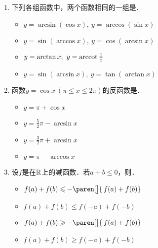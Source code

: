 \documentclass[a4paper,punct=CCT]{ctexbook}
\theoremstyle{definition}
\theoremstyle{remark}
\newif\ifshowsol
\let\leq\leqslant
\let\le\leq
\let\geq\geqslant
\let\ge\geq}
\begin{document}
\begin{enumerate}
\item 下列各组函数中，两个函数相同的一组是\uline{\makebox[6em]{}}．
  \begin{itemize}
    \renewcommand{\labelitemi}{\faCircleThin}
  \item \(y = \arcsin(\cos x),\ y = \arccos(\sin x)\)
    \ifshowsol
  \item[\faCircle] \(y = \sin(\arccos x),\ y = \cos(\arcsin x)\)
    \else
  \item \(y = \sin(\arccos x),\ y = \cos(\arcsin x)\)
    \fi
  \item \(y = \arctan x,\ y = \operatorname{arccot}\frac1x\)
  \item \(y = \sin(\arcsin x),\ y = \tan(\arctan x)\)
  \end{itemize}

  \ifshowsol
  选项C和D中的函数都是因为定义域的不同而导致函数不同的．
  \fi

\item 函数\(y = \cos x\ (\pi \le x \le 2\pi)\)的反函数是\uline{\makebox[6em]{}}．
  \begin{itemize}
    \renewcommand{\labelitemi}{\faCircleThin}
  \item \(y = \pi + \cos x\)
  \item \(y = \frac52\pi - \arcsin x\)
    \ifshowsol
  \item[\faCircle] \(y = \frac32\pi + \arcsin x\)
    \else
  \item \(y = \frac32\pi + \arcsin x\)
    \fi
  \item \(y = \pi - \arccos x\)
  \end{itemize}

\item 设\(f\)是在\(\mathbb{R}\)上的减函数．若\(a + b \le 0\)，则\uline{\makebox[6em]{}}．
  \begin{itemize}
    \renewcommand{\labelitemi}{\faCircleThin}
  \item \(f(a) + f(b) \le -\paren[\big]{\,f(a) + f(b)}\)
  \item \(f(a) + f(b) \le f(-a) + f(-b)\)
  \item \(f(a) + f(b) \ge -\paren[\big]{\,f(a) + f(b)}\)
    \ifshowsol
  \item[\faCircle] \(f(a) + f(b) \ge f(-a) + f(-b)\)
    \else
  \item \(f(a) + f(b) \ge f(-a) + f(-b)\)
    \fi
  \end{itemize}

  \ifshowsol
  选项A和C都可以通过举反例来证伪，比方说\(f(x) = \arccot x\)证伪了A，\(f(x) = -\pi + \arccot x\)证伪了C．对于B和D，可以根据\(a + b \le 0\)的性质来说明．两个数的和非正，这就说明至少其中有一个数非正．当另外一个数也是非正的时候，易证D成立．当另外一个数是正数的时候，不失一般地，不妨假设\(a \le 0 < b\)，那么有\(a \le -b < 0 < b \le -a\)．所以有
  \[
    f(a) \ge f(-b) > f(b) \ge f(-a).
  \]
  因此D成立．
  \fi


\end{enumerate}
\end{document}
